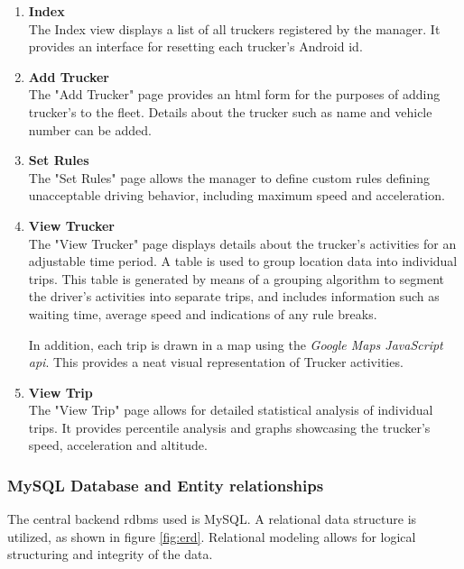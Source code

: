 \begin{enumerate}
\begin{enumerate}
\item \textbf{Index}\\
The Index view displays a list of all truckers registered by the manager.
It provides an interface for resetting each trucker's Android \ac{id}.

\item \textbf{Add Trucker}\\
The "Add Trucker" page provides an \ac{html} form for the purposes of adding trucker's to the fleet.
Details about the trucker such as name and vehicle number can be added.

\item \textbf{Set Rules}\\
The "Set Rules" page allows the manager to define custom rules defining unacceptable driving behavior, including maximum speed and acceleration.

\item \textbf{View Trucker}\\
The "View Trucker" page displays details about the trucker's activities for an adjustable time period.
A table is used to group location data into individual trips.
This table is generated by means of a grouping algorithm to segment the driver's activities into separate trips, and includes information such as waiting time, average speed and indications of any rule breaks.

In addition, each trip is drawn in a map using the \textit{Google Maps JavaScript \ac{api}}.
This provides a neat visual representation of Trucker activities.

\item \textbf{View Trip}\\
The "View Trip" page allows for detailed statistical analysis of individual trips.
It provides percentile analysis and graphs showcasing the trucker's speed, acceleration and altitude.
\end{enumerate}

\end{enumerate}

\subsubsection{MySQL Database and Entity relationships}
The central backend \ac{rdbms} used is MySQL.
A relational data structure is utilized, as shown in figure \ref{fig:erd}.
Relational modeling allows for logical structuring and integrity of the data.

